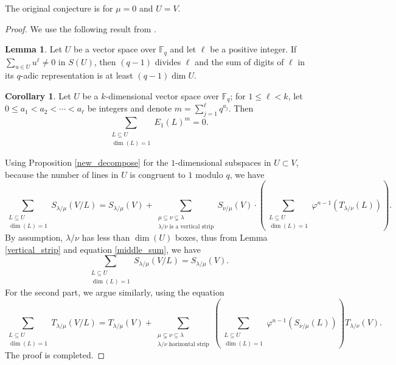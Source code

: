 \documentclass[12pt,a4paper]{report}
\theoremstyle{definition}
\newtheorem{corollary}{Corollary}[theorem]
\newtheorem{lemma}[theorem]{Lemma}
\theoremstyle{remark}
\theoremstyle{definition}
\begin{document}
The original conjecture is for $\mu = 0$ and $U =V$. 
\begin{proof}
        We use the following result from \cite[Proposition 9.5]{Campbell1996BasesFR}.
\begin{lemma}\label{power_sum} 
Let $U$ be a vector space over $\mathbb{F}_q$ and let $\ell$ be a positive integer. If $\sum\limits_{u\in U} u^{\ell} \neq 0$ in $S(U)$, then $(q-1)$ divides $\ell$ and the sum of digits of $\ell$ in its $q$-adic representation is at least $(q-1) \dim U$.
    \end{lemma}
 \begin{corollary}
Let $U$ be a $k$-dimensional vector space over $\mathbb{F}_q$; for $1 \leq  \ell <k$, let $0\leq a_1 <a_2 < \cdots < a_{\ell}$ be integers and denote $m = \sum\limits_{j=1}^{\ell} q^{a_j}$. Then 
\begin{equation}\label{middle_sum}
    \sum\limits_{\substack{L\subseteq U\\ \dim(L) =1 }} E_1(L)^m = 0.
\end{equation}
 \end{corollary}
     Using Proposition \ref{new_decompose} for the $1$-dimensional subspaces in $U \subset V$, because the number of lines in $U$ is congruent to $1$ modulo $q$, we have
     \begin{equation*}
        \sum\limits_{\substack{L\subseteq U\\
    \dim(L) = 1}}S_{\lambda/\mu}(V/L) = S_{\lambda/\mu}(V) +  \sum\limits_{\substack{\mu \subseteq \nu\subsetneq \lambda \\ \lambda/\nu \text{ is a vertical strip}}}S_{\nu/\mu}(V)\cdot\left(\sum\limits_{\substack{L\subseteq U\\
    \dim(L) = 1}} \varphi^{n-1}(T_{\lambda/\nu}(L))\right). 
    \end{equation*}
    By assumption, $\lambda/\nu$ has less than $\dim(U)$ boxes, thus from Lemma \ref{vertical_strip} and equation \eqref{middle_sum}, we have
    \begin{equation*}
        \sum\limits_{\substack{L\subseteq U\\
    \dim(L) = 1}}S_{\lambda/\mu}(V/L) = S_{\lambda/\mu}(V).
    \end{equation*}
    For the second part, we argue similarly, using the equation
     \begin{equation*}
        \sum\limits_{\substack{L\subseteq U\\
    \dim(L) = 1}} T_{\lambda/\mu}(V/L) = T_{\lambda/\mu}(V) +  \sum\limits_{\substack{\mu \subsetneq \nu\subseteq \lambda \\ \lambda/\nu \text{ horizontal strip}}}  \left(\sum\limits_{\substack{L\subseteq U\\
    \dim(L) = 1}} \varphi^{n-1}(S_{\nu/\mu}(L))\right) T_{\lambda/\nu} (V). 
    \end{equation*}
    The proof is completed.
\end{proof}
\end{document}
